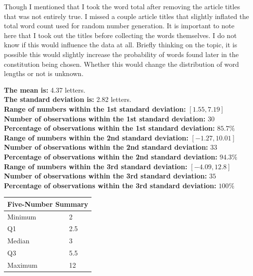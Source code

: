 \documentclass{homework}
\begin{document}
Though I mentioned that I took the word total after removing the article titles that was not entirely true. I missed a couple article titles that slightly inflated the total word count used for random number generation. It is important to note here that I took out the titles before collecting the words themselves. I do not know if this would influence the data at all. Briefly thinking on the topic, it is possible this would slightly increase the probability of words found later in the constitution being chosen. Whether this would change the distribution of word lengths or not is unknown.   

\newpage 

\textbf{The mean is:} 4.37 letters. \\
\textbf{The standard deviation is:} 2.82 letters. \\

\textbf{Range of numbers within the 1st standard deviation:} $[1.55, 7.19]$ \\
\textbf{Number of observations within the 1st standard deviation:} $30$ \\
\textbf{Percentage of observations within the 1st standard deviation:} $85.7\%$ \\

\textbf{Range of numbers within the 2nd standard deviation:} $[-1.27, 10.01]$ \\
\textbf{Number of observations within the 2nd standard deviation:} $33$ \\
\textbf{Percentage of observations within the 2nd standard deviation:} $94.3\%$ \\

\textbf{Range of numbers within the 3rd standard deviation:} $[-4.09, 12.8]$ \\
\textbf{Number of observations within the 3rd standard deviation:} $35$ \\
\textbf{Percentage of observations within the 3rd standard deviation:} $100\%$ \\


\begin{table}[h]
\begin{tabular}{@{}ll@{}}
\toprule 
\multicolumn{2}{l}{Five-Number Summary} \\ \midrule 
Minimum              & 2                \\
Q1                   & 2.5              \\
Median               & 3                \\
Q3                   & 5.5              \\
Maximum              & 12               \\ \bottomrule
\end{tabular}
\end{table}
\end{document}
